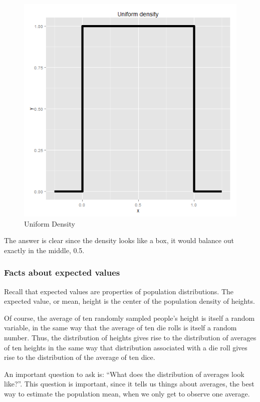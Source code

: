 \documentclass[]{article}
\begin{document}
\begin{figure}[htbp]
\centering
\includegraphics{LeanPub/images/uniform-1.png}
\caption{Uniform Density}
\end{figure}

The answer is clear since the density looks like a box, it would balance
out exactly in the middle, 0.5.

\subsubsection{Facts about expected
values}\label{facts-about-expected-values}

Recall that expected values are properties of population distributions.
The expected value, or mean, height is the center of the population
density of heights.

Of course, the average of ten randomly sampled people's height is itself
a random variable, in the same way that the average of ten die rolls is
itself a random number. Thus, the distribution of heights gives rise to
the distribution of averages of ten heights in the same way that
distribution associated with a die roll gives rise to the distribution
of the average of ten dice.

An important question to ask is: ``What does the distribution of
averages look like?''. This question is important, since it tells us
things about averages, the best way to estimate the population mean,
when we only get to observe one average.
\end{document}
